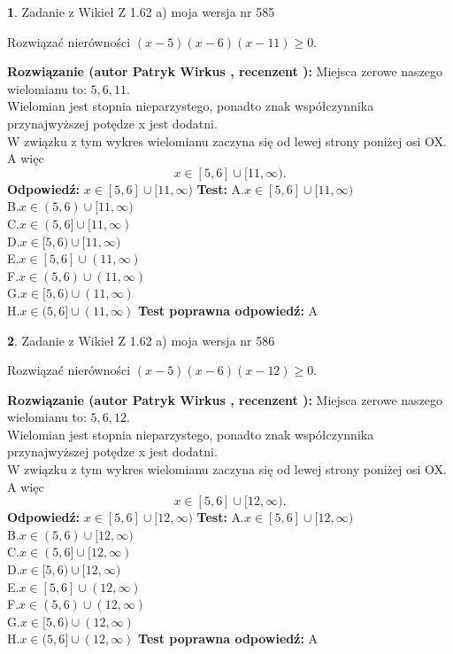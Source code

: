 \documentclass[12pt, a4paper]{article}
\theoremstyle{definition} %
\newtheorem{zad}{}
\newcommand{\zadStart}[1]{\begin{zad}#1\newline}
\newcommand{\zadStop}{\end{zad}}
\newcommand{\rozwStart}[2]{\noindent \textbf{Rozwiązanie (autor #1 , recenzent #2): }\newline}
\newcommand{\rozwStop}{\newline}
\newcommand{\odpStart}{\noindent \textbf{Odpowiedź:}\newline}
\newcommand{\odpStop}{\newline}
\newcommand{\testStart}{\noindent \textbf{Test:}\newline}
\newcommand{\testStop}{\newline}
\newcommand{\kluczStart}{\noindent \textbf{Test poprawna odpowiedź:}\newline}
\newcommand{\kluczStop}{\newline}
\begin{document}
\zadStart{Zadanie z Wikieł Z 1.62 a) moja wersja nr 585}

Rozwiązać nierówności $(x-5)(x-6)(x-11)\ge0$.
\zadStop
\rozwStart{Patryk Wirkus}{}
Miejsca zerowe naszego wielomianu to: $5, 6, 11$.\\
Wielomian jest stopnia nieparzystego, ponadto znak współczynnika przy\linebreak najwyższej potędze x jest dodatni.\\ W związku z tym wykres wielomianu zaczyna się od lewej strony poniżej osi OX. A więc $$x \in [5,6] \cup [11,\infty).$$
\rozwStop
\odpStart
$x \in [5,6] \cup [11,\infty)$
\odpStop
\testStart
A.$x \in [5,6] \cup [11,\infty)$\\
B.$x \in (5,6) \cup [11,\infty)$\\
C.$x \in (5,6] \cup [11,\infty)$\\
D.$x \in [5,6) \cup [11,\infty)$\\
E.$x \in [5,6] \cup (11,\infty)$\\
F.$x \in (5,6) \cup (11,\infty)$\\
G.$x \in [5,6) \cup (11,\infty)$\\
H.$x \in (5,6] \cup (11,\infty)$
\testStop
\kluczStart
A
\kluczStop



\zadStart{Zadanie z Wikieł Z 1.62 a) moja wersja nr 586}

Rozwiązać nierówności $(x-5)(x-6)(x-12)\ge0$.
\zadStop
\rozwStart{Patryk Wirkus}{}
Miejsca zerowe naszego wielomianu to: $5, 6, 12$.\\
Wielomian jest stopnia nieparzystego, ponadto znak współczynnika przy\linebreak najwyższej potędze x jest dodatni.\\ W związku z tym wykres wielomianu zaczyna się od lewej strony poniżej osi OX. A więc $$x \in [5,6] \cup [12,\infty).$$
\rozwStop
\odpStart
$x \in [5,6] \cup [12,\infty)$
\odpStop
\testStart
A.$x \in [5,6] \cup [12,\infty)$\\
B.$x \in (5,6) \cup [12,\infty)$\\
C.$x \in (5,6] \cup [12,\infty)$\\
D.$x \in [5,6) \cup [12,\infty)$\\
E.$x \in [5,6] \cup (12,\infty)$\\
F.$x \in (5,6) \cup (12,\infty)$\\
G.$x \in [5,6) \cup (12,\infty)$\\
H.$x \in (5,6] \cup (12,\infty)$
\testStop
\kluczStart
A
\kluczStop
\end{document}
